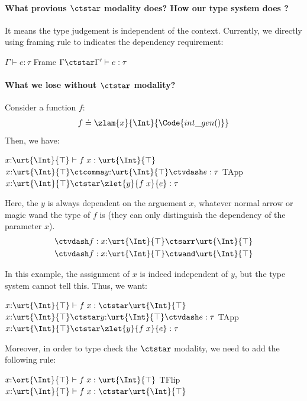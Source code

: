 \paragraph{What provious $\ctstar$ modality does? How our type system does ?} It means the type judgement is independent of the context. Currently, we directly using framing rule to indicates the dependency requirement:

\mprooftr{22mm}
  {$ \Gamma \vdash e : \tau$}
  {Frame}
  {$\Gamma \ctstar \Gamma' \vdash e : \tau$}

\paragraph{What we lose without $\ctstar$ modality?} Consider a function $f$:
\begin{align*}
  f \doteq \zlam{x}{\Int}{\Code{int\_gen()}}
\end{align*}\noindent
Then, we have:

\mprooftr{65mm}
  {$ x{:}\urt{\Int}{\top} \vdash f\; x : \urt{\Int}{\top}$ \quad $x{:}\urt{\Int}{\top} \ctcomma y{:}\urt{\Int}{\top} \ctvdash e : \tau$}
  {TApp}
  {$x{:}\urt{\Int}{\top} \ctstar \zlet{y}{f\;x}{e} : \tau$}

Here, the $y$ is always dependent on the arguement $x$, whatever normal arrow or magic wand the type of $f$ is (they can only distinguish the dependency of the parameter $x$).
\begin{align*}
  &\ctvdash f : x{:}\urt{\Int}{\top} \ctsarr \urt{\Int}{\top}
  \\&\ctvdash f : x{:}\urt{\Int}{\top} \ctwand \urt{\Int}{\top}
\end{align*}\noindent

In this example, the assignment of $x$ is indeed independent of $y$, but the type system cannot tell this. Thus, we want:

\mprooftr{65mm}
  {$ x{:}\urt{\Int}{\top} \vdash f\; x : \ctstar \urt{\Int}{\top}$ \quad $x{:}\urt{\Int}{\top} \ctstar y{:}\urt{\Int}{\top} \ctvdash e : \tau$}
  {TApp}
  {$x{:}\urt{\Int}{\top} \ctstar \zlet{y}{f\;x}{e} : \tau$}

Moreover, in order to type check the $\ctstar$ modality, we need to add the following rule:

\mprooftr{65mm}
  {$ x{:}\ort{\Int}{\top} \vdash f\; x : \urt{\Int}{\top}$}
  {TFlip}
  {$ x{:}\urt{\Int}{\top} \vdash f\; x : \ctstar \urt{\Int}{\top}$}


